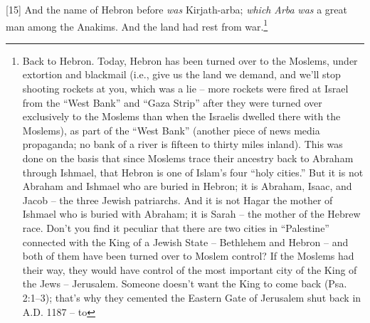 [15] \textcolor[rgb]{0.00,0.00,1.00}{And the name of Hebron before \emph{was} Kirjath-arba; \emph{which} \emph{Arba} \emph{was} a great man among the Anakims. And the land had rest from war.}\footnote{Back to Hebron. Today, Hebron has been
turned over to the Moslems, under extortion
and blackmail (i.e., give us the land we
demand, and we’ll stop shooting rockets at you,
which was a lie -- more rockets were fired at
Israel from the “West Bank” and “Gaza Strip”
after they were turned over exclusively to the
Moslems than when the Israelis dwelled there
with the Moslems), as part of the “West Bank”
(another piece of news media propaganda; no
bank of a river is fifteen to thirty miles inland).
This was done on the basis that since Moslems
trace their ancestry back to Abraham through
Ishmael, that Hebron is one of Islam’s four
“holy cities.” But it is not Abraham and Ishmael
who are buried in Hebron; it is Abraham,
Isaac, and Jacob -- the three Jewish patriarchs.
And it is not Hagar the mother of Ishmael who
is buried with Abraham; it is Sarah -- the
mother of the Hebrew race.
Don’t you find it peculiar that there are two
cities in “Palestine” connected with the King of
a Jewish State -- Bethlehem and Hebron -- and
both of them have been turned over to Moslem
control? If the Moslems had their way, they
would have control of the most important city
of the King of the Jews -- Jerusalem. Someone
doesn’t want the King to come back (Psa. 2:1--3); that’s why they cemented the Eastern Gate
of Jerusalem shut back in A.D. 1187 -- to
}
